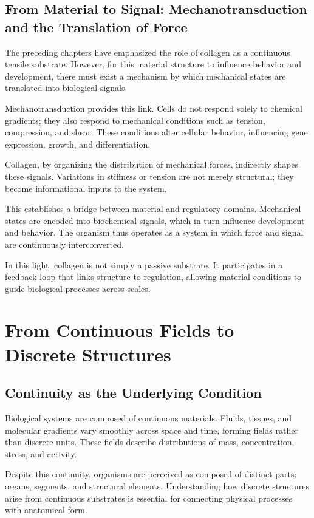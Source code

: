 \documentclass[11pt,oneside]{book}
\begin{document}
\section{From Material to Signal: Mechanotransduction and the Translation of Force}

The preceding chapters have emphasized the role of collagen as a continuous tensile substrate. However, for this material structure to influence behavior and development, there must exist a mechanism by which mechanical states are translated into biological signals.

Mechanotransduction provides this link. Cells do not respond solely to chemical gradients; they also respond to mechanical conditions such as tension, compression, and shear. These conditions alter cellular behavior, influencing gene expression, growth, and differentiation.

Collagen, by organizing the distribution of mechanical forces, indirectly shapes these signals. Variations in stiffness or tension are not merely structural; they become informational inputs to the system.

This establishes a bridge between material and regulatory domains. Mechanical states are encoded into biochemical signals, which in turn influence development and behavior. The organism thus operates as a system in which force and signal are continuously interconverted.

In this light, collagen is not simply a passive substrate. It participates in a feedback loop that links structure to regulation, allowing material conditions to guide biological processes across scales.

\chapter{From Continuous Fields to Discrete Structures}

\section{Continuity as the Underlying Condition}

Biological systems are composed of continuous materials. Fluids, tissues, and molecular gradients vary smoothly across space and time, forming fields rather than discrete units. These fields describe distributions of mass, concentration, stress, and activity.

Despite this continuity, organisms are perceived as composed of distinct parts: organs, segments, and structural elements. Understanding how discrete structures arise from continuous substrates is essential for connecting physical processes with anatomical form.
\end{document}

